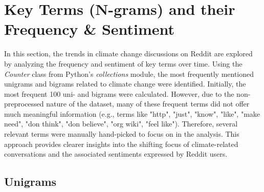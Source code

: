 \section{Key Terms (N-grams) and their Frequency \& Sentiment}
In this section, the trends in climate change discussions on Reddit are explored by analyzing the frequency and sentiment of key terms over time. Using the \emph{Counter} class from Python's \emph{collections} module, the most frequently mentioned unigrams and bigrams related to climate change were identified. Initially, the most frequent 100 uni- and bigrams were calculated. However, due to the non-preprocessed nature of the dataset, many of these frequent terms did not offer much meaningful information (e.g., terms like "http", "just", "know", "like", "make need", "don think", "don believe", "org wiki", "feel like"). Therefore, several relevant terms were manually hand-picked to focus on in the analysis. This approach provides clearer insights into the shifting focus of climate-related conversations and the associated sentiments expressed by Reddit users.

\subsection{Unigrams}
